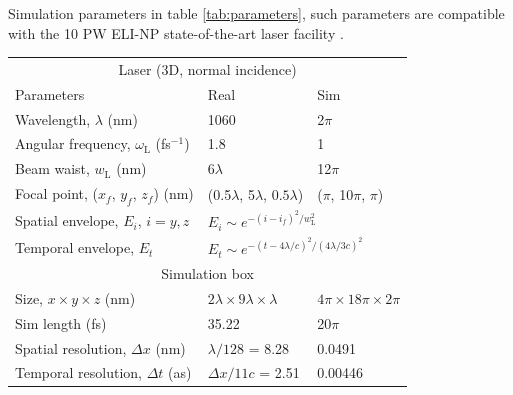 Simulation parameters in table \ref{tab:parameters}, such parameters are compatible with the 10 PW ELI-NP state-of-the-art laser facility \cite{tanakaCurrentStatusHighlights2020}.
\begin{table}[]
	\begin{center}
	\begin{tabular}{lll}
		\hline \hline
		\multicolumn{3}{c}{Laser (3D, normal incidence)}   \\
		Parameters                                        & Real                                 & Sim                         \\ \hline
		Wavelength, $\lambda$ (nm)                        & 1060                                 & 2$\pi$                      \\
		Angular frequency, $\omega_\mathrm{L}$ (fs$^{-1}$)         & 1.8                                  & 1                           \\
		Beam waist, $w_\mathrm{L}$ (nm)                            & 6$\lambda$                           & 12$\pi$                     \\
		Focal point, ($x_f$, $y_f$, $z_f$) (nm)                  & (0.5$\lambda$, 5$\lambda$, $0.5\lambda$)             & ($\pi$, 10$\pi$, $\pi$)           \vspace{0.25cm}\\ 
		Spatial envelope, $E_i$, $i = y,z$                           & \multicolumn{2}{l}{$E_i \sim e^{-(i-i_f)^2/w_\mathrm{L}^2}$}                \\
		Temporal envelope, $E_t$                          & \multicolumn{2}{l}{$E_t \sim e^{-(t-4\lambda/c)^2/(4\lambda/3c)^2}$} \vspace{0.15cm}\\ \hline \hline
		\multicolumn{3}{c}{Simulation box}   \\ \hline
		Size, $x \times y\times z$ (nm)                           & $2\lambda \times 9\lambda \times \lambda$          & $4\pi \times 18\pi \times 2\pi$         \\
		Sim length (fs)                                   & 35.22                                & 20$\pi$                     \\
		Spatial resolution, $\Delta x$ (nm)               & $\lambda/128$ = 8.28                 & 0.0491                      \\
		Temporal resolution, $\Delta t$ (as)              & $\Delta x/11c$ = 2.51               & 0.00446                   \vspace{0.15cm}  \\ \hline \hline

\end{tabular}
\end{center}
\end{table}
